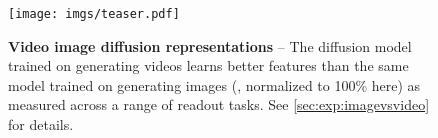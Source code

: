 \begin{figure}[t]
\centering
\texttt{[image: imgs/teaser.pdf]}
\setlength{\belowcaptionskip}{-5pt}
\caption{
    \textbf{Video \vs image diffusion representations} --
    The diffusion model \vwalt trained on generating videos learns better features than the same model trained on generating images (\iwalt, normalized to 100\% here) as measured across a range of readout tasks.
    See \cref{sec:exp:imagevsvideo} for details.
}
\label{fig:teaser}
\end{figure}
